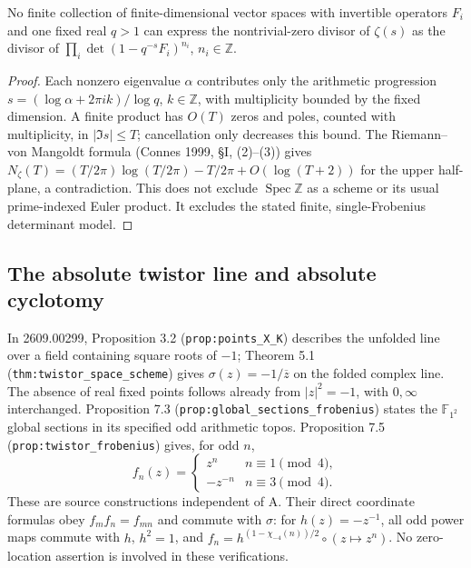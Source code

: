 \begin{proposition}
\label{AC-G03}
No finite collection of finite-dimensional vector spaces with invertible
operators $F_i$ and one fixed real $q>1$ can express the nontrivial-zero
divisor of $\zeta(s)$ as the divisor of
$\prod_i\det(1-q^{-s}F_i)^{n_i}$, $n_i\in\mathbb Z$.
\end{proposition}
\begin{proof}
Each nonzero eigenvalue $\alpha$ contributes only the arithmetic progression
$s=(\log\alpha+2\pi i k)/\log q$, $k\in\mathbb Z$,
with multiplicity bounded by the fixed dimension.  A finite product has
$O(T)$ zeros and poles, counted with multiplicity, in $|\Im s|\leq T$;
cancellation only decreases this bound.  The Riemann--von Mangoldt formula (Connes 1999, \S I, (2)--(3)) gives
$N_\zeta(T)=(T/2\pi)\log(T/2\pi)-T/2\pi+O(\log(T+2))$
for the upper half-plane, a contradiction.  This does not exclude
$\operatorname{Spec}\mathbb Z$ as a scheme or its usual prime-indexed Euler
product.  It excludes the stated finite, single-Frobenius determinant model.
\end{proof}

\subsection{The absolute twistor line and absolute cyclotomy}

In 2609.00299, Proposition 3.2 (\texttt{prop:points\_X\_K}) describes the
unfolded line over a field containing square roots of $-1$; Theorem 5.1
(\texttt{thm:twistor\_space\_scheme}) gives
$\sigma(z)=-1/\overline z$ on the folded complex line.  The absence of real
fixed points follows already from $|z|^2=-1$, with $0,\infty$ interchanged.
Proposition 7.3 (\texttt{prop:global\_sections\_frobenius}) states the
$\mathbb F_{1^2}$ global sections in its specified odd arithmetic topos.
Proposition 7.5 (\texttt{prop:twistor\_frobenius}) gives, for odd $n$,
\[
 f_n(z)=\begin{cases}z^n&n\equiv1\pmod4,\\-z^{-n}&n\equiv3\pmod4.
 \end{cases}
\]
These are source constructions independent of A.  Their direct coordinate
formulas obey $f_mf_n=f_{mn}$ and commute with $\sigma$: for
$h(z)=-z^{-1}$, all odd power maps commute with $h$, $h^2=1$, and
$f_n=h^{(1-\chi_{-4}(n))/2}\circ(z\mapsto z^n)$.
No zero-location assertion is involved in these verifications.

